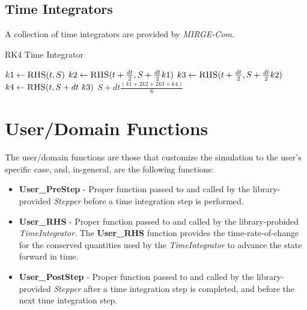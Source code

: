 \documentclass{article}
\begin{document}
\subsection{Time Integrators}
A collection of time integrators are provided by \textit{MIRGE-Com}. 
\begin{algorithm}
  \caption{RK4 Time Integrator}
  \begin{algorithmic}[1]
    \State $k1 \gets \Call{RHS}{t, S}$
    \State $k2 \gets \Call{RHS}{t + \frac{dt}{2}, S + \frac{dt}{2}k1}$
    \State $k3 \gets \Call{RHS}{t + \frac{dt}{2}, S + \frac{dt}{2}k2}$
    \State $k4 \gets \Call{RHS}{t, S + dt~k3}$
    \State \Return $S + dt\frac{\left(k1 + 2k2 + 2k3 + k4\right)}{6}$
    \EndProcedure  \end{algorithmic}
\end{algorithm}

\section{User/Domain Functions}

The user/domain functions are those that customize the simulation to the user's specific case, and, in-general, are the following functions:
\begin{itemize}
\item \textbf{User\_PreStep} - Proper function passed to and called by the library-provided \textit{Stepper} before a time integration step is performed.
\item \textbf{User\_RHS} - Proper function passed to and called by the library-probided \textit{TimeIntegrator}. The \textbf{User\_RHS} function provides the time-rate-of-change for the conserved quantities used by the \textit{TimeIntegrator} to advance the state forward in time.
\item \textbf{User\_PostStep} - Proper function passed to and called by the library-provided \textit{Stepper} after a time integration step is completed, and before the next time integration step.
\end{itemize}
\end{document}
